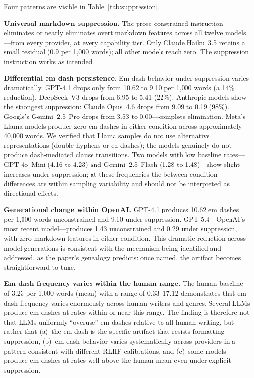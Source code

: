 Four patterns are visible in Table~\ref{tab:suppression}.

\textbf{Universal markdown suppression.} The prose-constrained instruction eliminates or nearly eliminates overt markdown features across all twelve models---from every provider, at every capability tier. Only Claude Haiku~3.5 retains a small residual (0.9 per 1,000 words); all other models reach zero. The suppression instruction works as intended.

\textbf{Differential em dash persistence.} Em dash behavior under suppression varies dramatically. GPT-4.1 drops only from 10.62 to 9.10 per 1,000 words (a 14\% reduction). DeepSeek~V3 drops from 6.95 to 5.41 (22\%). Anthropic models show the strongest suppression: Claude Opus~4.6 drops from 9.09 to 0.19 (98\%). Google's Gemini~2.5~Pro drops from 3.53 to 0.00---complete elimination. Meta's Llama models produce zero em dashes in either condition across approximately 40,000 words. We verified that Llama samples do not use alternative representations (double hyphens or en dashes); the models genuinely do not produce dash-mediated clause transitions. Two models with low baseline rates---GPT-4o~Mini (4.16 to 4.23) and Gemini~2.5~Flash (1.28 to 1.48)---show slight increases under suppression; at these frequencies the between-condition differences are within sampling variability and should not be interpreted as directional effects.

\textbf{Generational change within OpenAI.} GPT-4.1 produces 10.62 em dashes per 1,000 words unconstrained and 9.10 under suppression. GPT-5.4---OpenAI's most recent model---produces 1.43 unconstrained and 0.29 under suppression, with zero markdown features in either condition. This dramatic reduction across model generations is consistent with the mechanism being identified and addressed, as the paper's genealogy predicts: once named, the artifact becomes straightforward to tune.

\textbf{Em dash frequency varies within the human range.} The human baseline of 3.23 per 1,000 words (mean) with a range of 0.33--17.12 demonstrates that em dash frequency varies enormously across human writers and genres. Several LLMs produce em dashes at rates within or near this range. The finding is therefore not that LLMs uniformly ``overuse'' em dashes relative to all human writing, but rather that (a)~the em dash is the specific artifact that resists formatting suppression, (b)~em dash behavior varies systematically across providers in a pattern consistent with different RLHF calibrations, and (c)~some models produce em dashes at rates well above the human mean even under explicit suppression.

